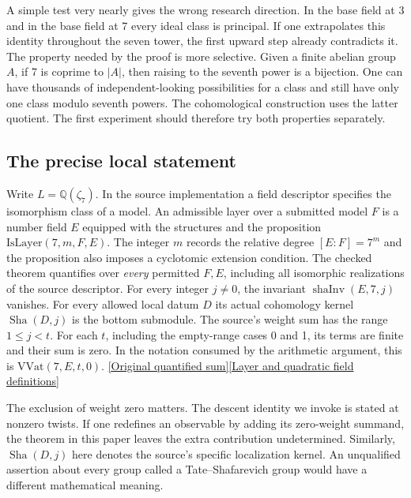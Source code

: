 \documentclass[12pt,letterpaper]{article}
\begin{document}
A simple test very nearly gives the wrong research direction. In the base field at 3 and in the base field at 7 every ideal class is principal. If one extrapolates this identity throughout the seven tower, the first upward step already contradicts it. The property needed by the proof is more selective. Given a finite abelian group \(A\), if 7 is coprime to \(|A|\), then raising to the seventh power is a bijection. One can have thousands of independent-looking possibilities for a class and still have only one class modulo seventh powers. The cohomological construction uses the latter quotient. The first experiment should therefore try both properties separately.

\subsection{The precise local statement}
Write \(L=\mathbb Q(\zeta_7)\). In the source implementation a field descriptor specifies the isomorphism class of a model. An admissible layer over a submitted model \(F\) is a number field \(E\) equipped with the structures and the proposition \(\mathrm{IsLayer}(7,m,F,E)\). The integer \(m\) records the relative degree \([E:F]=7^m\) and the proposition also imposes a cyclotomic extension condition. The checked theorem quantifies over \emph{every} permitted \(F,E\), including all isomorphic realizations of the source descriptor. For every integer \(j\ne0\), the invariant \(\operatorname{shaInv}(E,7,j)\) vanishes. For every allowed local datum \(D\) its actual cohomology kernel \(\operatorname{Sha}(D,j)\) is the bottom submodule. The source's weight sum has the range \(1\le j<t\). For each \(t\), including the empty-range cases 0 and 1, its terms are finite and their sum is zero. In the notation consumed by the arithmetic argument, this is \(\mathrm{VVat}(7,E,t,0)\). \href{https://github.com/nousentllc/riemann-hypothesis/blob/40e56bab026552e089d7afcfeff08d2defb9c005/src/Development/AutomorphicArithmetic/AutomorphicVarieties/LengthEqAddEigen.lean#L107-L110}{[Original quantified sum]}\quad\href{https://github.com/nousentllc/riemann-hypothesis/blob/40e56bab026552e089d7afcfeff08d2defb9c005/src/Development/AutomorphicArithmetic/AutomorphicVarieties/StmtFields.lean#L46-L50}{[Layer and quadratic field definitions]}

The exclusion of weight zero matters. The descent identity we invoke is stated at nonzero twists. If one redefines an observable by adding its zero-weight summand, the theorem in this paper leaves the extra contribution undetermined. Similarly, \(\operatorname{Sha}(D,j)\) here denotes the source's specific localization kernel. An unqualified assertion about every group called a Tate--Shafarevich group would have a different mathematical meaning.
\end{document}
